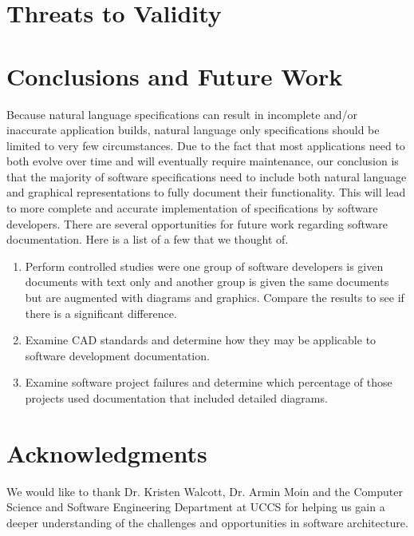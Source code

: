 \documentclass{acm_proc_article-sp}
\begin{document}
\section{Threats to Validity}

\section{Conclusions and Future Work}
Because natural language specifications can result in incomplete and/or inaccurate application builds, natural language only specifications should be limited to very few circumstances. Due to the fact that most applications need to both evolve over time and will eventually require maintenance, our conclusion is that the majority of software specifications need to include both natural language and graphical representations to fully document their functionality. This will lead to more complete and accurate implementation of specifications by software developers.
\newline
There are several opportunities for future work regarding software documentation. Here is a list of a few that we thought of.
\begin{enumerate}
	\item Perform controlled studies were one group of software developers is given documents with text only and another group is given the same documents but are augmented with diagrams and graphics. Compare the results to see if there is a significant difference.
	\item Examine CAD standards and determine how they may be applicable to software development documentation.
	\item Examine software project failures and determine which percentage of those projects used documentation that included detailed diagrams. 
\end{enumerate}

\section{Acknowledgments}
We would like to thank Dr. Kristen Walcott, Dr. Armin Moin and the Computer Science and Software Engineering Department at UCCS for helping us gain a deeper understanding of the challenges and opportunities in software architecture.
\end{document}

